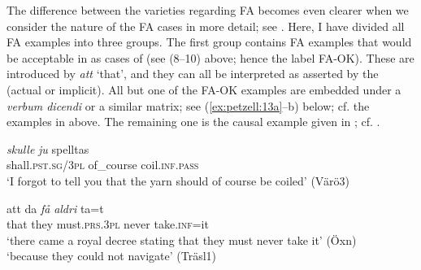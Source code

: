 \documentclass[output=paper,colorlinks,citecolor=brown,draft,draftmode]{langscibook}
\begin{document}
The difference between the varieties regarding FA becomes even clearer when we consider the nature of the FA cases in more detail; see . Here, I have divided all FA examples into three groups. The first group contains FA examples that would be acceptable in  as cases of  (see (8–10) above; hence the label FA-OK). These are introduced by \textit{att} ‘that’, and they can all be interpreted as asserted by the  (actual or implicit). All but one of the FA-OK examples are embedded under a \textit{verbum dicendi} or a similar matrix; see (\ref{ex:petzell:13a}–b) below; cf. the examples in  above. The remaining one is the causal example given in ; cf. .


\ea\label{ex:petzell:13}

\gll    \textit{{skulle}} \textit{{ju}}        spelltas    \\
    shall.\textsc{pst.sg}/3\textsc{pl}  of\_course  coil.\textsc{inf}.\textsc{pass}\\
\glt `I forgot to tell you that the yarn should of course be coiled' (Värö3)  \\


\gll    att      da \textit{{få}} \textit{{aldri}} ta=t        \\
    that    they    must.\textsc{prs}.3\textsc{pl}  never    take.\textsc{inf}=it    \\
\glt `there came a royal decree stating that they must never take it’ (Öxn)    \\

\glt `because they could not navigate’ (Träsl1)
\z
\z
\end{document}
